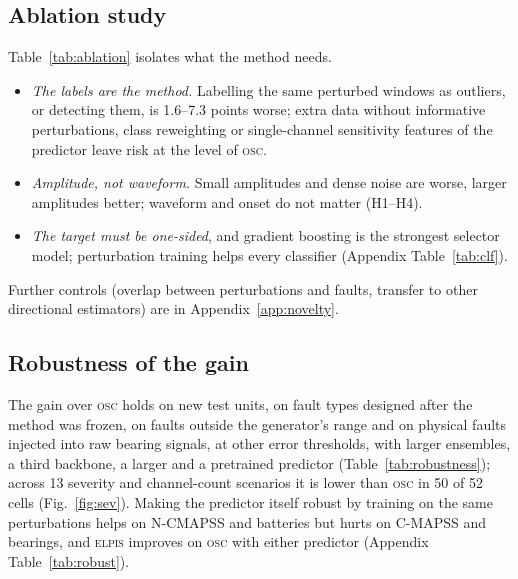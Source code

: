 \documentclass{esannV2}
\newcommand{\OSC}{\textsc{osc}}
\newcommand{\RPT}{\textsc{elpis}}
\begin{document}
\subsection{Ablation study}\label{sec:novelty}\label{sec:abl}\label{sec:clf}
Table~\ref{tab:ablation} isolates what the method needs.
\begin{itemize}
\item \emph{The labels are the method.} Labelling the same perturbed windows as outliers, or detecting them, is 1.6--7.3 points worse; extra data without informative perturbations, class reweighting or single-channel sensitivity features of the predictor leave risk at the level of \OSC.
\item \emph{Amplitude, not waveform.} Small amplitudes and dense noise are worse, larger amplitudes better; waveform and onset do not matter (H1--H4).
\item \emph{The target must be one-sided}, and gradient boosting is the strongest selector model; perturbation training helps every classifier (Appendix Table~\ref{tab:clf}).
\end{itemize}
Further controls (overlap between perturbations and faults, transfer to other directional estimators) are in Appendix~\ref{app:novelty}.

\FloatBarrier
\subsection{Robustness of the gain}\label{sec:stress}\label{sec:checks}\label{sec:backbone}\label{sec:robust}
The gain over \OSC{} holds on new test units, on fault types designed after the method was frozen, on faults outside the generator's range and on physical faults injected into raw bearing signals, at other error thresholds, with larger ensembles, a third backbone, a larger and a pretrained predictor (Table~\ref{tab:robustness}); across 13 severity and channel-count scenarios it is lower than \OSC{} in 50 of 52 cells (Fig.~\ref{fig:sev}). Making the predictor itself robust by training on the same perturbations helps on N-CMAPSS and batteries but hurts on C-MAPSS and bearings, and \RPT{} improves on \OSC{} with either predictor (Appendix Table~\ref{tab:robust}).

\FloatBarrier
\end{document}
